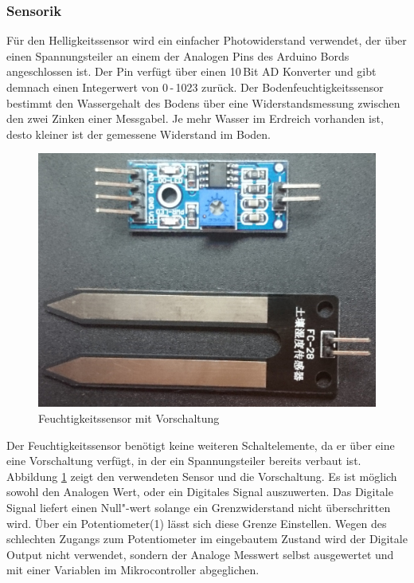 \documentclass[]{IEEEtran}
\begin{document}
			
\subsubsection{Sensorik} \label{sensorik}
Für den Helligkeitssensor wird ein einfacher Photowiderstand verwendet, der über einen Spannungsteiler an einem der Analogen Pins des Arduino Bords angeschlossen ist. Der Pin verfügt über einen 10\,Bit AD Konverter und gibt demnach einen Integerwert von 
0\,-\,1023 zurück.
Der Bodenfeuchtigkeitssensor bestimmt den Wassergehalt des Bodens über eine Widerstandsmessung zwischen den zwei Zinken einer Messgabel. 
Je mehr Wasser im Erdreich vorhanden ist, desto kleiner ist der gemessene Widerstand im Boden.

\begin{figure}[!h]
	\centering
	\includegraphics[width=0.8\linewidth]{bilder/_feuchteSensor1.jpg}
	\caption{Feuchtigkeitssensor mit Vorschaltung}
	\label{fig-SensorVorschaltung}
\end{figure}
Der Feuchtigkeitssensor benötigt keine weiteren Schaltelemente, da er über eine eine Vorschaltung verfügt, in der ein Spannungsteiler bereits verbaut ist. 
Abbildung \ref{fig-SensorVorschaltung} zeigt den verwendeten Sensor und die Vorschaltung. 
Es ist möglich sowohl den Analogen Wert, oder ein Digitales Signal auszuwerten. 
Das Digitale Signal liefert einen Null"-wert solange ein Grenzwiderstand nicht überschritten wird. 
Über ein  Potentiometer(1) lässt sich diese Grenze Einstellen. 
Wegen des schlechten Zugangs zum Potentiometer im eingebautem Zustand wird der Digitale Output nicht verwendet, sondern der Analoge Messwert selbst ausgewertet und mit einer Variablen im Mikrocontroller abgeglichen.
		
\end{document}
